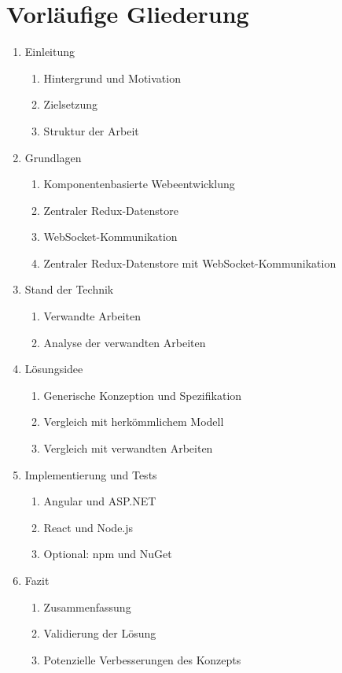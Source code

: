 \documentclass[12pt]{article} %
\begin{document}
\section{Vorläufige Gliederung}

\begin{enumerate}

\item Einleitung
\begin{enumerate}[label*=\arabic*]
\item Hintergrund und Motivation
\item Zielsetzung
\item Struktur der Arbeit
\end{enumerate}

\item Grundlagen
\begin{enumerate}[label*=\arabic*]
\item Komponentenbasierte Webeentwicklung
\item Zentraler Redux-Datenstore
\item WebSocket-Kommunikation
\item Zentraler Redux-Datenstore mit WebSocket-Kommunikation
\end{enumerate}

\item Stand der Technik
\begin{enumerate}[label*=\arabic*]
\item Verwandte Arbeiten
\item Analyse der verwandten Arbeiten
\end{enumerate}

\item Lösungsidee
\begin{enumerate}[label*=\arabic*]
\item Generische Konzeption und Spezifikation
\item Vergleich mit herkömmlichem Modell
\item Vergleich mit verwandten Arbeiten
\end{enumerate}

\item Implementierung und Tests
\begin{enumerate}[label*=\arabic*]
\item Angular und ASP.NET
\item React und Node.js
\item Optional: npm und NuGet
\end{enumerate}

\item Fazit
\begin{enumerate}[label*=\arabic*]
\item Zusammenfassung
\item Validierung der Lösung
\item Potenzielle Verbesserungen des Konzepts
\end{enumerate}
\end{enumerate}
\end{document}
